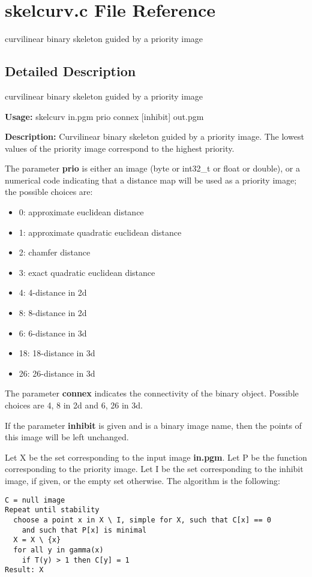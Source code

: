 \section{skelcurv.c File Reference}
\label{skelcurv_8c}
curvilinear binary skeleton guided by a priority image 



\subsection{Detailed Description}
curvilinear binary skeleton guided by a priority image 

{\bf Usage:} skelcurv in.pgm prio connex [inhibit] out.pgm

{\bf Description:} Curvilinear binary skeleton guided by a priority image. The lowest values of the priority image correspond to the highest priority.

The parameter {\bf prio} is either an image (byte or int32\_\-t or float or double), or a numerical code indicating that a distance map will be used as a priority image; the possible choices are: \begin{itemize}
\item 0: approximate euclidean distance \item 1: approximate quadratic euclidean distance \item 2: chamfer distance \item 3: exact quadratic euclidean distance \item 4: 4-distance in 2d \item 8: 8-distance in 2d \item 6: 6-distance in 3d \item 18: 18-distance in 3d \item 26: 26-distance in 3d\end{itemize}
The parameter {\bf connex} indicates the connectivity of the binary object. Possible choices are 4, 8 in 2d and 6, 26 in 3d.

If the parameter {\bf inhibit} is given and is a binary image name, then the points of this image will be left unchanged.

Let X be the set corresponding to the input image {\bf in.pgm}. Let P be the function corresponding to the priority image. Let I be the set corresponding to the inhibit image, if given, or the empty set otherwise. The algorithm is the following:



\footnotesize\begin{verbatim}
C = null image
Repeat until stability
  choose a point x in X \ I, simple for X, such that C[x] == 0 
    and such that P[x] is minimal
  X = X \ {x}
  for all y in gamma(x)
    if T(y) > 1 then C[y] = 1
Result: X
\end{verbatim}
\normalsize


